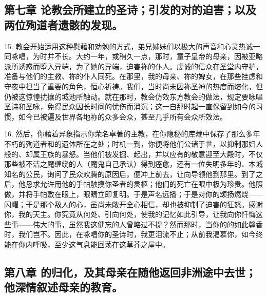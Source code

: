 
\subsection{第七章 论教会所建立的圣诗；引发的对的迫害；以及两位殉道者遗骸的发现。}

15. 教会开始运用这种慰藉和劝勉的方式，弟兄姊妹们以极大的声音和心灵热诚一同咏唱，为时并不长。大约一年，或稍久一点，那时，童子皇帝的母亲，因被亚略派所诱惑而堕入异端，为了她的异端，迫害祢的仆人。虔诚的信众在圣堂内守护，准备与他们的主教、祢的仆人同死。在那里，我的母亲、祢的婢女，在那些挂虑和守夜中担当了重要的角色，恒心祈祷。我们，当时尚未因祢圣神的热度而熔化，但仍被这惊惶扰攘的城池所触动。就在那时，教会仿效东方教会的做法，规定要咏唱圣诗和圣咏，免得民众因长时间的忧伤而消沉；这一自那时起一直保留到如今的习惯，如今已被遍及世界各地祢的众多会众，甚至几乎所有会众所效法。\par

16. 然后，你藉着异象指示你荣名卓著的主教，在你隐秘的库藏中保存了那么多年不朽的殉道者和的遗体所在之处；时机一到，你便将他们公诸于世，以抑制那妇人般的、却属王族的暴怒。当他们被发掘、起出，并以应有的敬意迎至大殿时，不仅那些被不洁之魔缠绕的人（魔鬼自己承认）得到痊愈，还有一位失明多年的、本城知名的公民，询问了民众欢腾的原因后，便冲上前去，让向导领他到那里。到了之后，他恳求允许用他的手帕触摸你圣者的灵柩；他们的死亡在眼中极为珍贵。他照做，并将手帕敷在眼上，眼睛立即复明。于是声名远播；于是对你的颂扬燃烧——闪耀；于是那个敌人的心，虽尚未敞开全心相信，却也被抑制了迫害的狂怒。感谢你，我的天主。你究竟从何处、引向何处，使我的记忆如此引导，让我向你忏悔这些事——伟大的事，虽然我这健忘的人曾略过不提？然而那时，当你的的如此馨香时，我们岂不。因此，在咏唱你的圣诗时，我更泪流不止；从前我渴慕你，如今终能在你内呼吸，至少这气息能回荡在这草芥之屋中。\par


\subsection{第八章 的归化，及其母亲在随他返回非洲途中去世；他深情叙述母亲的教育。}

